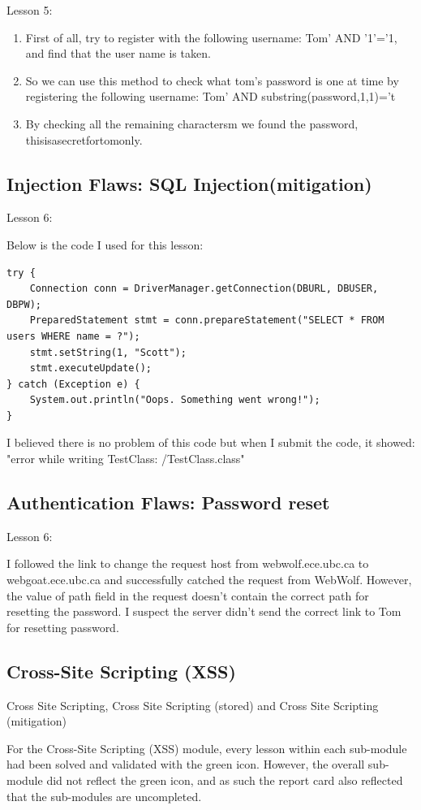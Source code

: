 \documentclass[conference]{IEEEtran}
\begin{document}
Lesson 5:
\begin{enumerate}
\item  First of all, try to register with the following username: Tom' AND '1'='1, and find that the user name is taken.
\item So we can use this method to check what tom's password is one at time by registering the following username: Tom' AND substring(password,1,1)='t
\item By checking all the remaining charactersm we found the password, thisisasecretfortomonly.
\end{enumerate}

\subsection{Injection Flaws: SQL Injection(mitigation)}
Lesson 6:

Below is the code I used for this lesson:
\begin{lstlisting}
try {
	Connection conn = DriverManager.getConnection(DBURL, DBUSER, DBPW);
	PreparedStatement stmt = conn.prepareStatement("SELECT * FROM users WHERE name = ?");
	stmt.setString(1, "Scott");
	stmt.executeUpdate();
} catch (Exception e) {
    System.out.println("Oops. Something went wrong!");
}
\end{lstlisting}
I believed there is no problem of this code but when I submit the code, it showed: "error while writing TestClass: /TestClass.class"

\subsection{Authentication Flaws: Password reset}
Lesson 6:

I followed the link to change the request host from webwolf.ece.ubc.ca to webgoat.ece.ubc.ca and successfully catched the request from WebWolf. However, the value of path field in the request doesn't contain the correct path for resetting the password. I suspect the server didn't send the correct link to Tom for resetting password.

\subsection{Cross-Site Scripting (XSS)}
Cross Site Scripting, Cross Site Scripting (stored) and Cross Site Scripting (mitigation)

For the Cross-Site Scripting (XSS) module, every lesson within each sub-module had been solved and validated with the green icon. However, the overall sub-module did not reflect the green icon, and as such the report card also reflected that the sub-modules are uncompleted.
\end{document}

